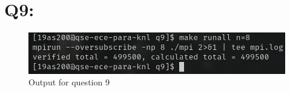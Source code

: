 \documentclass[11pt]{article}
\begin{document}
\section*{Q9:}



\begin{figure}[ht]
\centering
    \includegraphics[width=\textwidth]{./images/q9.png}
\caption{Output for question 9}
\label{fig:q9}
\end{figure}

\clearpage
\begin{appendices}\label{Appendix}
  
  
  
  
  

\end{appendices}

\newpage

% 
% 
\end{document}
